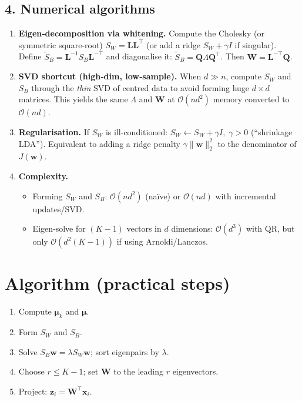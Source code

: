 \subsection*{4.\; Numerical algorithms}

\begin{enumerate}
\item \textbf{Eigen‑decomposition via whitening.}  
      Compute the Cholesky (or symmetric square‑root) $S_W=\mathbf L\mathbf L^\top$  
      (or add a ridge $S_W+\gamma I$ if singular).  
      Define $\tilde{S}_B=\mathbf L^{-1}S_B\mathbf L^{-\top}$ and diagonalise it:  
      $\tilde{S}_B=\mathbf Q\Lambda\mathbf Q^\top$.  Then
      $\mathbf W=\mathbf L^{-\top}\mathbf Q$.

\item \textbf{SVD shortcut (high‑dim, low‑sample).}  
      When $d\gg n$, compute $S_W$ and $S_B$ through the \emph{thin} SVD of
      centred data to avoid forming huge $d\times d$ matrices.
      This yields the same $\Lambda$ and $\mathbf W$ at $\mathcal O(nd^2)$
      memory converted to $\mathcal O(nd)$.

\item \textbf{Regularisation.}  
      If $S_W$ is ill‑conditioned:
      \(
        S_W \leftarrow S_W + \gamma I,
        \; \gamma>0
      \)
      (``shrinkage LDA'').  Equivalent to adding a ridge penalty
      $\gamma\|\mathbf w\|_2^2$ to the denominator of $J(\mathbf w)$.

\item \textbf{Complexity.}  
      \begin{itemize}
        \item Forming $S_W$ and $S_B$: $\mathcal O(nd^2)$ (naïve) or
              $\mathcal O(nd)$ with incremental updates/SVD.
        \item Eigen‑solve for $(K-1)$ vectors in $d$ dimensions:  
              $\mathcal O(d^3)$ with QR, but only $\mathcal O(d^2(K-1))$
              if using Arnoldi/Lanczos.
      \end{itemize}
\end{enumerate}

\section{Algorithm (practical steps)}

\begin{enumerate}
  \item Compute $\boldsymbol\mu_k$ and $\boldsymbol\mu$.
  \item Form $S_W$ and $S_B$.
  \item Solve $S_B\mathbf w=\lambda S_W\mathbf w$; sort eigenpairs by $\lambda$.
  \item Choose $r\le K-1$; set $\mathbf W$ to the leading $r$ eigenvectors.
  \item Project: $\mathbf z_i=\mathbf W^{\top}\mathbf x_i$.
\end{enumerate}

